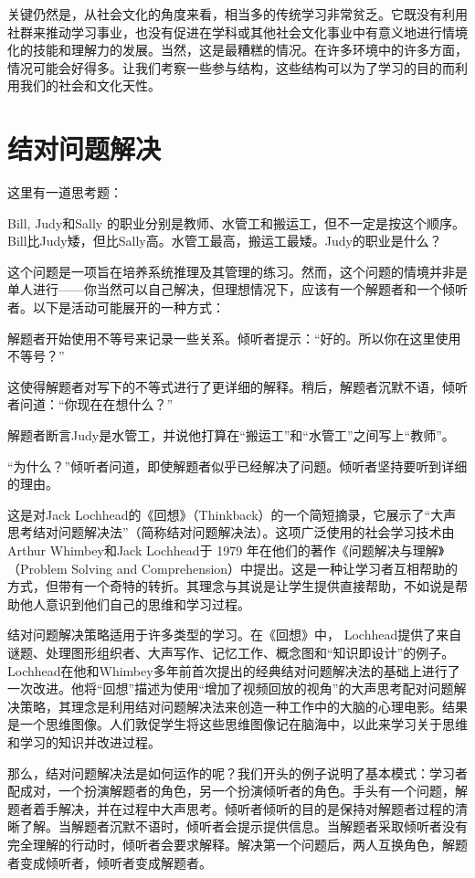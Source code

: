 关键仍然是，从社会文化的角度来看，相当多的传统学习非常贫乏。它既没有利用社群来推动学习事业，也没有促进在学科或其他社会文化事业中有意义地进行情境化的技能和理解力的发展。当然，这是最糟糕的情况。在许多环境中的许多方面，情况可能会好得多。让我们考察一些参与结构，这些结构可以为了学习的目的而利用我们的社会和文化天性。

\section*{结对问题解决}

这里有一道思考题：

Bill, Judy和Sally 的职业分别是教师、水管工和搬运工，但不一定是按这个顺序。Bill比Judy矮，但比Sally高。水管工最高，搬运工最矮。Judy的职业是什么？

这个问题是一项旨在培养系统推理及其管理的练习。然而，这个问题的情境并非是单人进行——你当然可以自己解决，但理想情况下，应该有一个解题者和一个倾听者。以下是活动可能展开的一种方式：

解题者开始使用不等号来记录一些关系。倾听者提示：“好的。所以你在这里使用不等号？”

这使得解题者对写下的不等式进行了更详细的解释。稍后，解题者沉默不语，倾听者问道：“你现在在想什么？”

解题者断言Judy是水管工，并说他打算在“搬运工”和“水管工”之间写上“教师”。

“为什么？”倾听者问道，即使解题者似乎已经解决了问题。倾听者坚持要听到详细的理由。

这是对Jack Lochhead的《回想》（Thinkback）的一个简短摘录，它展示了“大声思考结对问题解决法”（简称结对问题解决法）。这项广泛使用的社会学习技术由 Arthur Whimbey和Jack Lochhead于 1979 年在他们的著作《问题解决与理解》（Problem Solving and Comprehension）中提出。这是一种让学习者互相帮助的方式，但带有一个奇特的转折。其理念与其说是让学生提供直接帮助，不如说是帮助他人意识到他们自己的思维和学习过程。

结对问题解决策略适用于许多类型的学习。在《回想》中， Lochhead提供了来自谜题、处理图形组织者、大声写作、记忆工作、概念图和“知识即设计”的例子。Lochhead在他和Whimbey多年前首次提出的经典结对问题解决法的基础上进行了一次改进。他将“回想”描述为使用“增加了视频回放的视角”的大声思考配对问题解决策略，其理念是利用结对问题解决法来创造一种工作中的大脑的心理电影。结果是一个思维图像。人们敦促学生将这些思维图像记在脑海中，以此来学习关于思维和学习的知识并改进过程。

那么，结对问题解决法是如何运作的呢？我们开头的例子说明了基本模式：学习者配成对，一个扮演解题者的角色，另一个扮演倾听者的角色。手头有一个问题，解题者着手解决，并在过程中大声思考。倾听者倾听的目的是保持对解题者过程的清晰了解。当解题者沉默不语时，倾听者会提示提供信息。当解题者采取倾听者没有完全理解的行动时，倾听者会要求解释。解决第一个问题后，两人互换角色，解题者变成倾听者，倾听者变成解题者。

